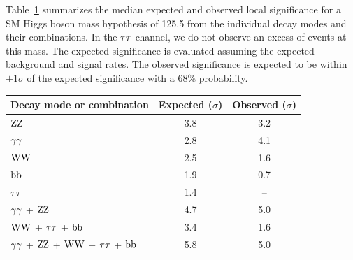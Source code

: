 \documentclass[12pt,twoside,a4paper,cmspaper,final,collab]{cms-tdr}
\begin{document}
Table~\ref{tab:Signif} summarizes the median expected and observed local significance
for a SM Higgs boson mass hypothesis of 125.5\GeV
from the individual decay modes and their combinations.
In the $\tau\tau$ channel, we do not observe an excess of events at this mass.
The expected significance is evaluated assuming
the expected background and signal rates.
The observed significance is expected to be within $\pm 1\sigma$  of
the expected significance with a 68\% probability.


\begin{table}[htbp]
\begin{center}
\label{tab:Signif}
\begin{tabular}{l|c|c}
\hline
Decay mode or combination & Expected ($\sigma$) & Observed ($\sigma$) \\
\hline\hline
$\mathrm{Z}\mathrm{Z}$    &  3.8  & 3.2  \\ %
$\gamma\gamma$    &  2.8  & 4.1  \\ %
$\mathrm{W}\mathrm{W}$      &  2.5 &  1.6  \\ %
$\mathrm{b}\mathrm{b}$  &  1.9 &  0.7  \\ %
$\tau\tau$    &  1.4 &  --   \\ %
\hline
$\gamma\gamma$ + $\mathrm{Z}\mathrm{Z}$                 & 4.7  & 5.0 \\
$\mathrm{W}\mathrm{W}$ + $\tau\tau$ + $\mathrm{b}\mathrm{b}$    & 3.4  & 1.6 \\
\hline
$\gamma\gamma$ + $\mathrm{Z}\mathrm{Z}$ + $\mathrm{W}\mathrm{W}$ + $\tau\tau$ + $\mathrm{b}\mathrm{b}$ & 5.8 & 5.0 \\%
\hline
\end{tabular}
\end{center}
\end{table}
\end{document}
